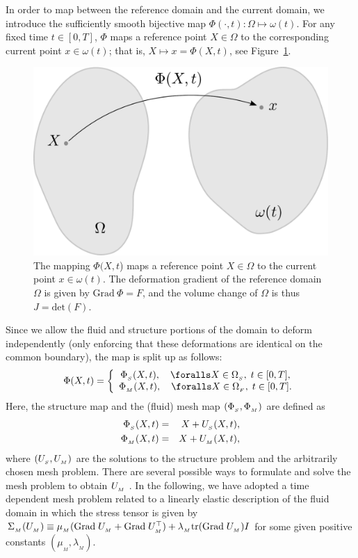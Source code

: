 In order to map between the reference domain and the current domain,
we introduce the sufficiently smooth bijective map $\Phi(\cdot,
t):\Omega\mapsto \omega(t)$.  For any fixed time $t\in[0,T]$, $\Phi$
maps a reference point $X\in\Omega$ to the corresponding current point
$x\in\omega(t)$; that is, $X \mapsto x = \Phi(X,t)$, see
Figure~\ref{selim:fig:mapping}.
\begin{figure}
\begin{center}
  \includegraphics[width=\smallfig]{chapters/selim/pdf/mapping.pdf}
 \caption{The mapping $\Phi(X,t$) maps a reference point $X\in\Omega$
   to the current point $x\in\omega(t)$. The deformation gradient of
   the reference domain $\Omega$ is given by $\textrm{Grad}\:\Phi =
   F$, and the volume change of $\Omega$ is thus $J = \textrm{det}(F)$.}
 \label{selim:fig:mapping}
\end{center}
\end{figure}
Since we allow the fluid and structure portions of the domain to
deform independently (only enforcing that these deformations are
identical on the common boundary), the map is split up as follows:
\begin{equation}
\label{selim:eq:ALEmapI}
\Phi(X,t) =
\left\{
\begin{array}{ccc}
\PhiS(X, t), \quad \foralls X\in\OS,\; t\in[0,T],\\
\PhiM(X, t), \quad \foralls X\in\OF,\; t\in[0,T].
\end{array}
\right.
\end{equation}
Here, the structure map and the (fluid) mesh map $(\Phi_{_{S}}, \Phi_{_{M}})$ are
defined as
\begin{eqnarray}
\label{selim:eq:ALEmapII}
\Phi_{_{S}}(X, t) &=& X + U_{_{S}}(X,t),\\
\Phi_{_{M}}(X, t) &=& X + U_{_{M}}(X,t),
\end{eqnarray}
where $(U_{_{S}}, U_{_{M}})$ are the solutions to the structure problem and the
arbitrarily chosen mesh problem.  There are several
possible ways to formulate and solve the mesh problem to obtain
$U_{_{M}}$ \citep{HermanssonHansbo2003, LopezNigroStorti2008}.  In the
following, we have adopted a time dependent mesh problem related to a
linearly elastic description of the fluid domain in which the stress
tensor is given by $\Sigma_{_{M}}(U_{_{M}})\equiv \mu_{{_M}}(\textrm{Grad}\;U_{_{M}} +
\textrm{Grad}\;U_{_{M}}^{\top})+ \lambda_{_{M}}\textrm{tr}(\textrm{Grad}\;U_{_{M}})I$ for some given
positive constants $(\mu_{{_M}},\lambda_{_{M}})$.

